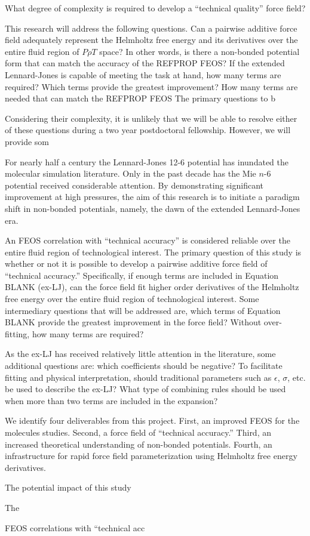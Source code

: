 \documentclass[11pt,a4paper]{article}
\begin{document}
What degree of complexity is required to develop a ``technical quality'' force field? 

This research will address the following questions. Can a pairwise additive force field adequately represent the Helmholtz free energy and its derivatives over the entire fluid region of $P \rho T$ space? In other words, is there a non-bonded potential form that can match the accuracy of the REFPROP FEOS? If the extended Lennard-Jones is capable of meeting the task at hand, how many terms are required? Which terms provide the greatest improvement?  How many terms are needed  that can match the REFPROP FEOS 
The primary questions to b

Considering their complexity, it is unlikely that we will be able to resolve either of these questions during a two year postdoctoral fellowship. However, we will provide som 

For nearly half a century the Lennard-Jones 12-6 potential has inundated the molecular simulation literature. Only in the past decade has the Mie $n$-6 potential received considerable attention. By demonstrating significant improvement at high pressures, the aim of this research is to initiate a paradigm shift in non-bonded potentials, namely, the dawn of the extended Lennard-Jones era.

An FEOS correlation with ``technical accuracy'' is considered reliable over the entire fluid region of technological interest. The primary question of this study is whether or not it is possible to develop a pairwise additive force field of ``technical accuracy.'' Specifically, if enough terms are included in Equation BLANK (ex-LJ), can the force field fit higher order derivatives of the Helmholtz free energy over the entire fluid region of technological interest. Some intermediary questions that will be addressed are, which terms of Equation BLANK provide the greatest improvement in the force field? Without over-fitting, how many terms are required? 

As the ex-LJ has received relatively little attention in the literature, some additional questions are: which coefficients should be negative? To facilitate fitting and physical interpretation, should traditional parameters such as $\epsilon$, $\sigma$, etc. be used to describe the ex-LJ? What type of combining rules should be used when more than two terms are included in the expansion?

We identify four deliverables from this project. First, an improved FEOS for the molecules studies. Second, a force field of ``technical accuracy.'' Third, an increased theoretical understanding of non-bonded potentials. Fourth, an infrastructure for rapid force field parameterization using Helmholtz free energy derivatives. 

The potential impact of this study 

The  

 
FEOS correlations with ``technical acc
\end{document}
